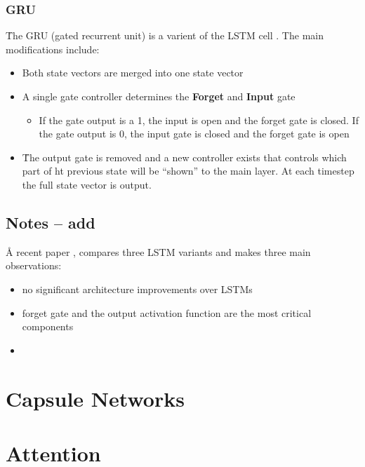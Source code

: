 \subsubsection{GRU}

\r{The GRU (gated recurrent unit) is a varient of the LSTM cell . The main modifications include:}

\begin{itemize}[noitemsep,topsep=0pt]
	\item Both state vectors are merged into one state vector
	\item A single gate controller determines the \textbf{Forget} and \textbf{Input} gate
	\begin{itemize}[noitemsep,topsep=0pt]
		\item If the gate output is a 1, the input is open and the forget gate is closed. If the gate output is 0, the input gate is closed and the forget gate is open
	\end{itemize}
	\item \r{The output gate is removed and a new controller exists that controls which part of ht previous state will be ``shown'' to the main layer}. At each timestep the full state vector is output.
\end{itemize}

\subsection{Notes -- add}

\r{A recent paper , compares three LSTM variants and makes three main observations:}

\begin{itemize}[noitemsep,topsep=0pt]
	\item no significant architecture improvements over LSTMs
	\item forget gate and the output activation function are the most critical components
	\item {}
\end{itemize}




\section{Capsule Networks}


\section{Attention}

